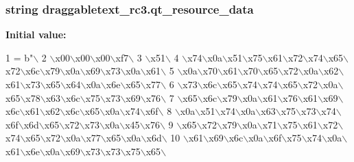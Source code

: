 \subsubsection[{qt\+\_\+resource\+\_\+data}]{\setlength{\rightskip}{0pt plus 5cm}string draggabletext\+\_\+rc3.\+qt\+\_\+resource\+\_\+data}\label{namespacedraggabletext__rc3_a6476f48ba0b70aa88156c734caaf9a5e}
{\bfseries Initial value\+:}
\begin{DoxyCode}
1 = b\textcolor{stringliteral}{"\(\backslash\)}
2 \textcolor{stringliteral}{\(\backslash\)x00\(\backslash\)x00\(\backslash\)x00\(\backslash\)xf7\(\backslash\)}
3 \textcolor{stringliteral}{\(\backslash\)x51\(\backslash\)}
4 \textcolor{stringliteral}{\(\backslash\)x74\(\backslash\)x0a\(\backslash\)x51\(\backslash\)x75\(\backslash\)x61\(\backslash\)x72\(\backslash\)x74\(\backslash\)x65\(\backslash\)x72\(\backslash\)x6c\(\backslash\)x79\(\backslash\)x0a\(\backslash\)x69\(\backslash\)x73\(\backslash\)x0a\(\backslash\)x61\(\backslash\)}
5 \textcolor{stringliteral}{\(\backslash\)x0a\(\backslash\)x70\(\backslash\)x61\(\backslash\)x70\(\backslash\)x65\(\backslash\)x72\(\backslash\)x0a\(\backslash\)x62\(\backslash\)x61\(\backslash\)x73\(\backslash\)x65\(\backslash\)x64\(\backslash\)x0a\(\backslash\)x6e\(\backslash\)x65\(\backslash\)x77\(\backslash\)}
6 \textcolor{stringliteral}{\(\backslash\)x73\(\backslash\)x6c\(\backslash\)x65\(\backslash\)x74\(\backslash\)x74\(\backslash\)x65\(\backslash\)x72\(\backslash\)x0a\(\backslash\)x65\(\backslash\)x78\(\backslash\)x63\(\backslash\)x6c\(\backslash\)x75\(\backslash\)x73\(\backslash\)x69\(\backslash\)x76\(\backslash\)}
7 \textcolor{stringliteral}{\(\backslash\)x65\(\backslash\)x6c\(\backslash\)x79\(\backslash\)x0a\(\backslash\)x61\(\backslash\)x76\(\backslash\)x61\(\backslash\)x69\(\backslash\)x6c\(\backslash\)x61\(\backslash\)x62\(\backslash\)x6c\(\backslash\)x65\(\backslash\)x0a\(\backslash\)x74\(\backslash\)x6f\(\backslash\)}
8 \textcolor{stringliteral}{\(\backslash\)x0a\(\backslash\)x51\(\backslash\)x74\(\backslash\)x0a\(\backslash\)x63\(\backslash\)x75\(\backslash\)x73\(\backslash\)x74\(\backslash\)x6f\(\backslash\)x6d\(\backslash\)x65\(\backslash\)x72\(\backslash\)x73\(\backslash\)x0a\(\backslash\)x45\(\backslash\)x76\(\backslash\)}
9 \textcolor{stringliteral}{\(\backslash\)x65\(\backslash\)x72\(\backslash\)x79\(\backslash\)x0a\(\backslash\)x71\(\backslash\)x75\(\backslash\)x61\(\backslash\)x72\(\backslash\)x74\(\backslash\)x65\(\backslash\)x72\(\backslash\)x0a\(\backslash\)x77\(\backslash\)x65\(\backslash\)x0a\(\backslash\)x6d\(\backslash\)}
10 \textcolor{stringliteral}{\(\backslash\)x61\(\backslash\)x69\(\backslash\)x6c\(\backslash\)x0a\(\backslash\)x6f\(\backslash\)x75\(\backslash\)x74\(\backslash\)x0a\(\backslash\)x61\(\backslash\)x6e\(\backslash\)x0a\(\backslash\)x69\(\backslash\)x73\(\backslash\)x73\(\backslash\)x75\(\backslash\)x65\(\backslash\)}

\end{DoxyCode}
